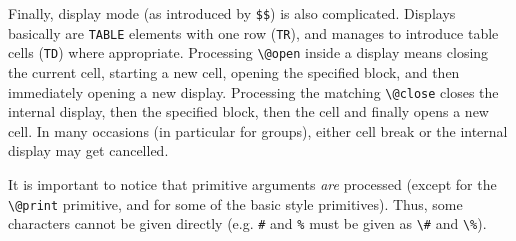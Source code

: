 Finally, display mode (as introduced by \verb+$$+) is also
complicated. Displays basically are \verb+TABLE+ elements with one row
(\verb+TR+), and \hevea{} manages to introduce table cells (\verb+TD+)
where appropriate.  Processing \verb+\@open+ inside a display
means closing the current cell, starting a new cell, opening the
specified block, and then immediately opening a new display.
Processing the matching \verb+\@close+ closes the internal
display, then the specified block, then the cell and finally opens a
new cell. In many occasions (in particular for groups), either cell
break or the internal display may get cancelled.


It is important to notice that primitive arguments \emph{are}
processed (except for the \verb+\@print+ primitive, and for some of
the basic style primitives). Thus,
some characters cannot be given directly (e.g. \verb+#+ and
\verb+%+ must be given as \verb+\#+ and \verb+\%+).
